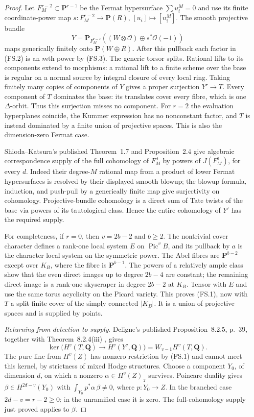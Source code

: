 \begin{proof}
Let $F_M^{r-2}\subset\mathbf P^{r-1}$ be the Fermat hypersurface
$\sum u_i^M=0$ and use its finite coordinate-power map
$s:F_M^{r-2}\to\mathbf P(R)$, $[u_i]\mapsto[u_i^M]$.
The smooth projective bundle
\[
        Y=\mathbf P_{F_M^{r-2}}
              ((W\otimes\mathcal O)\oplus s^*\mathcal O(-1))
\tag{FS.4}
\]
maps generically finitely onto $\mathbf P(W\oplus R)$.
After this pullback each factor in (FS.2) is an $m$th power by
(FS.3).  The generic torsor splits.  Rational lifts to its components
extend to morphisms: a rational lift to a finite scheme over the
base is regular on a normal source by integral closure of every
local ring.  Taking finitely many copies of components of $Y$ gives
a proper surjection $Y'\to T$.  Every component of $T$ dominates the
base: its translates cover every fibre, which is one $\Delta$-orbit.
Thus this surjection misses no component.  For $r=2$ the evaluation
hyperplanes coincide, the Kummer expression has no nonconstant
factor, and $T$ is instead dominated by a finite union of projective
spaces.  This is also the dimension-zero Fermat case.

Shioda--Katsura's published Theorem~1.7 and Proposition~2.4
\cite{Root:SK} give algebraic correspondence supply of the full
cohomology of $F_M^d$ by powers of $J(F_M^1)$, for every $d$.
Indeed their degree-$M$ rational map from a product of lower
Fermat hypersurfaces is resolved by their displayed smooth blowup;
the blowup formula, induction, and push-pull by a generically finite
map give surjectivity on cohomology.  Projective-bundle cohomology
is a direct sum of Tate twists of the base via powers of its
tautological class.  Hence the entire cohomology of $Y'$ has the
required supply.

For completeness, if $r=0$, then $v=2b-2$ and $b\ge2$.  The
nontrivial cover character defines a rank-one local system $E$ on
$\operatorname{Pic}^vB$, and its pullback by $a$ is the character
local system on the symmetric power.  The Abel fibres are
$\mathbf P^{b-2}$ except over $K_B$, where the fibre is
$\mathbf P^{b-1}$.  The powers of a relatively ample class show
that the even direct images up to degree $2b-4$ are constant;
the remaining direct image is a rank-one skyscraper in degree
$2b-2$ at $K_B$.  Tensor with $E$ and use the same torus
acyclicity on the Picard variety.  This proves (FS.1), now with
$T$ a split finite cover of the simply connected $|K_B|$.
It is a union of projective spaces and is supplied by points.

\emph{Returning from detection to supply.}
Deligne's published Proposition~8.2.5, p.~39, together with
Theorem~8.2.4(iii) \cite{Root:DeligneIII}, gives
\[
 \ker\bigl(H^v(T,\mathbf Q)\longrightarrow H^v(Y',\mathbf Q)\bigr)
                       =W_{v-1}H^v(T,\mathbf Q).
\tag{FS.5}
\]
The pure line from $H^v(Z)$ has nonzero restriction by (FS.1)
and cannot meet this kernel, by strictness of mixed Hodge structures.
Choose a component $Y_0$, of dimension $d$, on which a nonzero
$\alpha\in H^v(Z)_\chi$ survives.  Poincare duality gives
$\beta\in H^{2d-v}(Y_0)$ with
$\int_{Y_0}p^*\alpha\,\beta\ne0$, where $p:Y_0\to Z$.
In the branched case $2d-v=r-2\ge0$; in the unramified case it is
zero.  The full-cohomology supply just proved applies to $\beta$.


\end{proof}
